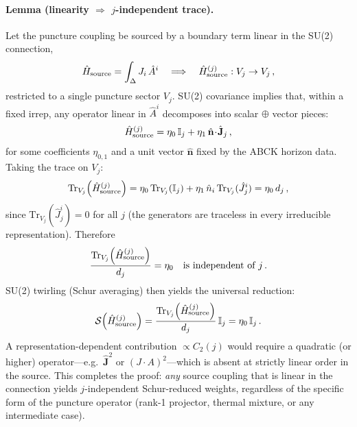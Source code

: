 \documentclass[aps,prd,twocolumn,10pt,superscriptaddress,nofootinbib]{revtex4-2}
\begin{document}
\paragraph{Lemma (linearity $\Rightarrow$ $j$-independent trace).}
Let the puncture coupling be sourced by a boundary term linear in
the SU(2) connection,
\begin{equation}
\hat{H}_{\rm source}
  = \int_\Delta J_i\,\hat{A}^i
  \quad\Longrightarrow\quad
  \hat{H}_{\rm source}^{(j)} : V_j \to V_j\,,
\label{eq:Hs_linear}
\end{equation}
restricted to a single puncture sector $V_j$.  SU(2) covariance
implies that, within a fixed irrep, any operator linear in
$\hat{A}^i$ decomposes into scalar $\oplus$ vector pieces:
\begin{equation}
\hat{H}_{\rm source}^{(j)}
  = \eta_0\,\mathbb{I}_j
    + \eta_1\,\hat{\mathbf{n}}\!\cdot\!\hat{\mathbf{J}}_j\,,
\label{eq:Hs_decomp}
\end{equation}
for some coefficients $\eta_{0,1}$ and a unit vector
$\hat{\mathbf{n}}$ fixed by the ABCK horizon data.  Taking the
trace on $V_j$:
\begin{equation}
\mathrm{Tr}_{V_j}\!\left(\hat{H}_{\rm source}^{(j)}\right)
  = \eta_0\,\mathrm{Tr}_{V_j}(\mathbb{I}_j)
    + \eta_1\,\hat{n}_i\,\mathrm{Tr}_{V_j}(\hat{J}^i_j)
  = \eta_0\,d_j\,,
\label{eq:trace_jindep}
\end{equation}
since $\mathrm{Tr}_{V_j}(\hat{J}^i_j) = 0$ for all $j$ (the
generators are traceless in every irreducible representation).
Therefore
\begin{equation}
\frac{\mathrm{Tr}_{V_j}\!\left(\hat{H}_{\rm source}^{(j)}\right)}
     {d_j}
  = \eta_0
  \quad\text{is independent of }j\,.
\label{eq:trace_over_d}
\end{equation}
SU(2) twirling (Schur averaging) then yields the universal
reduction:
\begin{equation}
\mathcal{S}\!\left(\hat{H}_{\rm source}^{(j)}\right)
  = \frac{\mathrm{Tr}_{V_j}\!\left(
      \hat{H}_{\rm source}^{(j)}\right)}{d_j}\,\mathbb{I}_j
  = \eta_0\,\mathbb{I}_j\,.
\label{eq:schur_linear_source}
\end{equation}
A representation-dependent contribution $\propto C_2(j)$ would
require a quadratic (or higher) operator---e.g.\
$\hat{\mathbf{J}}^2$ or $(J \!\cdot\! A)^2$---which is absent at
strictly linear order in the source.  This completes the proof:
\emph{any} source coupling that is linear in the connection yields
$j$-independent Schur-reduced weights, regardless of the specific
form of the puncture operator (rank-1 projector, thermal mixture,
or any intermediate case).
\end{document}
